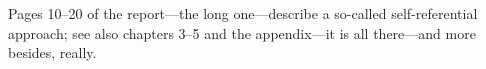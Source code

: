 \hsize=2.2in
Pages 10--20 of the report---the long one---describe a so-called self-referential approach; see also chapters 3--5 and the appendix---it is all there---and more besides, really.
\bye

